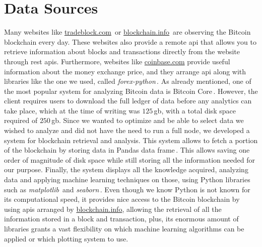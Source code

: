 \documentclass[USenglish]{uit-thesis}
\begin{document}
\section{Data Sources}
Many websites like \url{tradeblock.com}\,\cite{tradeblock}
or \url{blockchain.info}\,\cite{bitcoin_blockchain}
are observing the Bitcoin blockchain every day.
These websites also provide a remote \gls{api} 
that allows you to retrieve information about
blocks and transactions directly from
the website through \gls{rest} \gls{api}s.
Furthermore, websites like
\url{coinbase.com} provide useful information about the
money exchange price, and they arrange \gls{api} along with
libraries like the one we used, called
\emph{forex-python}\,\cite{forex-python}.
As already mentioned, one of the most
popular system for analyzing Bitcoin
data is Bitcoin Core\,\cite{bitcoincore}.
However, the client requires users to download
the full ledger of data before any analytics
can take place, which at the time of writing was
$125$\,\gls{gb}, with a total disk space required of
$250$\,\gls{gb}.
Since we wanted to optimize and
be able to select data we wished to analyze and
did not have the need to run a full node,
we developed a system for blockchain retrieval and analysis.
This system allows to fetch a portion of the blockchain by
storing data in Pandas data frame\,\cite{pandas}.
This allows saving one order of magnitude of disk space
while still storing all the information
needed for our purpose. Finally, the system
displays all the knowledge acquired,
analyzing data and applying machine learning techniques
on those, using Python libraries
such as \emph{matplotlib}\,\cite{matplotlib} and
\emph{seaborn}\,\cite{michael_waskom_seaborn}.
Even though we know
Python is not known for its computational speed,
it provides nice access to the
Bitcoin blockchain by using \gls{api}s arranged
by \url{blockchain.info}, allowing the retrieval
of all the information stored in a block and transaction,
plus, its enormous amount of libraries grants
a vast flexibility on which machine learning algorithms
can be applied or which plotting system to use.
\end{document}

